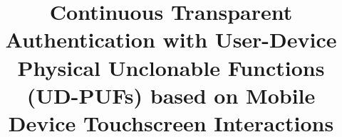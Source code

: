 \documentclass{acm_proc_article-sp}
\begin{document}
\graphicspath{{figures/}}

\title{Continuous Transparent Authentication with User-Device Physical Unclonable Functions (UD-PUFs) based on Mobile Device Touchscreen Interactions}
%
%
%
%
%

%
\end{document}
